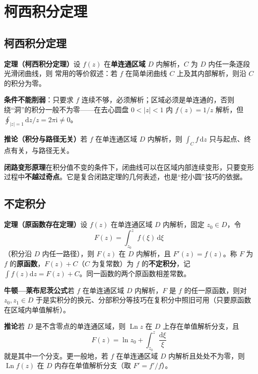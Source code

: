 \section{柯西积分定理}

\subsection{柯西积分定理}
\textbf{定理（柯西积分定理）}\quad 设 \(f(z)\) 在\textbf{单连通区域} \(D\) 内解析，\(C\) 为 \(D\) 内任一条逐段光滑闭曲线，则
常用的等价叙述：若 \(f\) 在简单闭曲线 \(C\) 上及其内部解析，则沿 \(C\) 的积分为零。

\textbf{条件不能削弱}：只要求 \(f\) 连续不够，必须解析；区域必须是单连通的，否则绕“洞”的积分一般不为零——在去心圆盘 \(0<|z|<1\) 内 \(f(z)=1/z\) 解析，但 \(\oint_{|z|=1}\mathrm{d}z/z=2\pi\mathrm{i}\neq 0\)。

\textbf{推论（积分与路径无关）}\quad 若 \(f\) 在单连通区域 \(D\) 内解析，则 \(\int_{C}f\,\mathrm{d}z\) 只与起点、终点有关，与路径无关。

\textbf{闭路变形原理}\quad 在积分值不变的条件下，闭曲线可以在区域内部连续变形，只要变形过程中\textbf{不越过奇点}。它是复合闭路定理的几何表述，也是“挖小圆”技巧的依据。

\subsection{不定积分}
\textbf{定理（原函数存在定理）}\quad 设 \(f(z)\) 在单连通区域 \(D\) 内解析，固定 \(z_{0}\in D\)，令
\[
F(z)=\int_{z_{0}}^{z}f(\xi)\,\mathrm{d}\xi
\]
（积分沿 \(D\) 内任一路径），则 \(F(z)\) 在 \(D\) 内解析，且 \(F'(z)=f(z)\)。称 \(F\) 为 \(f\) 的\textbf{原函数}，\(F(z)+C\)（\(C\) 为复常数）为 \(f\) 的\textbf{不定积分}，记 \(\int f(z)\mathrm{d}z=F(z)+C\)。同一函数的两个原函数相差常数。

\textbf{牛顿—莱布尼茨公式}\quad 若 \(f\) 在单连通区域 \(D\) 内解析，\(F\) 是 \(f\) 的任一原函数，则对 \(z_{0},z_{1}\in D\)
于是实积分的换元、分部积分等技巧在复积分中照旧可用（只要原函数在区域内单值解析）。

\textbf{推论}\quad 若 \(D\) 是不含零点的单连通区域，则 \(\operatorname{Ln}z\) 在 \(D\) 上存在单值解析分支，且
\[
F(z)=\ln z_{0}+\int_{z_{0}}^{z}\frac{\mathrm{d}\xi}{\xi}
\]
就是其中一个分支。更一般地，若 \(f\) 在单连通区域 \(D\) 内解析且处处不为零，则 \(\operatorname{Ln}f(z)\) 在 \(D\) 内存在单值解析分支（取 \(F'=f'/f\)）。

